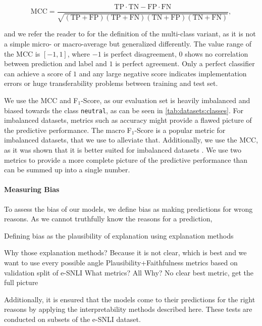 {\small $$\text{MCC} = \frac{\mathrm
{TP} \cdot \mathrm{TN} - \mathrm{FP} \cdot \mathrm{FN}}{\sqrt{(\mathrm{TP}+\mathrm{FP})(\mathrm{TP}+\mathrm{FN})(\mathrm{TN}+\mathrm{FP})(\mathrm{TN}+\mathrm{FN})}},$$}

and we refer the reader to \citet{mccMultiClass} for the definition of the multi-class variant, as it is not a simple micro- or macro-average but generalized differently. The value range of the \ac{MCC} is $[-1, 1]$, where $-1$ is perfect disagreement, $0$ shows no correlation between prediction and label and $1$ is perfect agreement. Only a perfect classifier can achieve a score of $1$ and any large negative score indicates implementation errors or huge transferability problems between training and test set.

We use the \ac{MCC} and F$_1$-Score, as our evaluation set is heavily imbalanced and biased towards the class \texttt{neutral}, as can be seen in \autoref{tab:datasets:classes}. For imbalanced datasets, metrics such as accuracy might provide a flawed picture of the predictive performance. The macro F$_1$-Score is a popular metric for imbalanced datasets, that we use to alleviate that. Additionally, we use the \ac{MCC}, as it was shown that it is better suited for imbalanced datasets \cite{mccGood}. We use two metrics to provide a more complete picture of the predictive performance than can be summed up into a single number.


\paragraph{Measuring Bias} \label{sec:exp:eval:bias}
To assess the bias of our models, we define bias as making predictions for wrong reasons. As we cannot truthfully know the reasons for a prediction, 


Defining bias as the plausibility of explanation using explanation methods

Why those explanation methods? Because it is not clear, which is best and we want to use every possible angle
Plausibility+Faithfulness metrics based on validation split of e-SNLI
What metrics? All
Why? No clear best metric, get the full picture

Additionally, it is ensured that the models come to their predictions for the right reasons by applying the interpretability methods described here. These tests are conducted on subsets of the \ac{e-SNLI} dataset. 